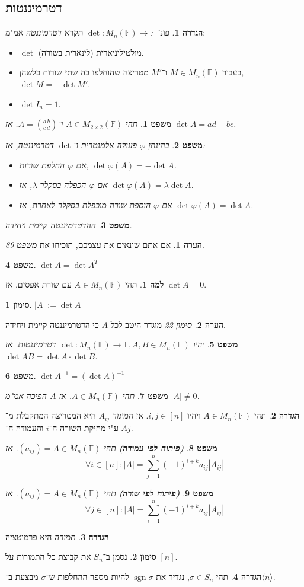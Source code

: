 \documentclass[]{article}
\newcommand\ra    {\rangle}
\newcommand\la    {\langle}
\DeclareMathOperator{\sgn}    {sgn}
\newcommand\F         {\mathbb{F}}
\newcommand\co        {\colon}
\renewcommand\lg      {\lambda}
\newcommand\sg        {\sigma}
\newcommand\op    {^{-1}}
\renewcommand\phi     {\varphi}
\newtheorem{Theorem}{משפט}
\theoremstyle{definition}
\newtheorem{definition}{הגדרה}
\newtheorem{Lemma}{למה}
\newtheorem{Remark}{הערה}
\newtheorem{Notion}{סימון}
\newcommand\theo  [1] {\begin{Theorem}#1\end{Theorem}}
\newcommand\defi  [1] {\begin{definition}#1\end{definition}}
\newcommand\rmark [1] {\begin{Remark}#1\end{Remark}}
\newcommand\lem   [1] {\begin{Lemma}#1\end{Lemma}}
\newcommand\noti  [1] {\begin{Notion}#1\end{Notion}}
\begin{document}
\begin{multicols}{2}
		\section{דטרמיננטות}
		\defi{פונ' $\det \co M_n(\F) \to \F$ תקרא \textit{דטרמיננטה} אמ"מ: 
		\begin{itemize}
			\item $\det$ מולטיליניארית (לינארית בשורה). 
			\item בעבור $M \in M_n(\F)$ ו־$M'$ מטריצה שהוחלפו בה שתי שורות כלשהן, $\det M = -\det M'$. 
			\item $\det I_n = 1$. 
		\end{itemize}}
		\theo{תהי $A \in M_{2 \times 2}(\F)$ ו־$A = \binom{a\, b}{c\, d}$. אז $\det A = ad - bc$. }
		\theo{בהינתן $\phi$ פעולה אלמנטרית ו־$\det$ דטרמיננטה, אז: 
		\begin{itemize}
			\item אם $\phi$ החלפת שורות, $\det \phi (A) = - \det A$. 
			\item אם $\phi$ הכפלה בסקלר $\lg$, אז $\det \phi (A) = \lg \det A$. 
			\item אם $\phi$ הוספת שורה מוכפלת בסקלר לאחרת, אז $\det \phi (A) = \det A$. 
		\end{itemize}}
		\theo{ההדטרמיננטה קיימת ויחידה. }
		\rmark{אם אתם שונאים את עצמכם, תוכיחו את \textit{משפט 89}. }
		\theo{$\det A = \det A^T$}
		\lem{תהי $A \in M_n(\F)$ עם שורת אפסים. אז $\det A = 0$. }
		\noti{\hfil $|A| := \det A$}
		\rmark{\textit{סימון 22} מוגדר היטב לכל $A$ כי הדטרמיננטה קיימת ויחידה. }
		\theo{יהיו $\det \co M_n(\F) \to \F, A, B \in M_n(\F)$ דטרמיננטות. אז $\det AB = \det A \cdot \det B$. }
		\theo{\hfil $\det A\op = (\det A)\op$}
		\theo{תהי $A \in M_n(\F)$. אז $A$ הפיכה אמ"מ $|A| \neq 0$. }
		\defi{תהי $A \in M_n(\F)$ ויהיו $i, j \in [n]$. אז ה\textit{מינור} $A_{ij}$ היא המטריצה המתקבלת מ־$A$ ע"י מחיקת השורה ה־$i$ והעמודה ה־$j$. }
		\begin{Theorem}\textbf{\textit{(פיתוח לפי עמודה)}}
			תהי $(a_{ij}) = A \in M_n(\F)$. אז 
			\[ \forall i \in [n] \co |A| = \sum_{j = 1}^{n}(-1)^{i + k}a_{ij} |A_{ij}| \]
		\end{Theorem}
		\begin{Theorem}\textbf{\textit{(פיתוח לפי שורה)}}
			תהי $(a_{ij}) = A \in M_n(\F)$. אז 
			\[ \forall j \in [n] \co |A| = \sum_{i = 1}^{n}(-1)^{i + k}a_{ij} |A_{ij}| \]
		\end{Theorem}
		
		\defi{\textit{תמורה} היא פרמוטציה}
		\noti{נסמן ב־$S_n$ את קבוצת כל התמורות על $[n]$. }
		\defi{תהי $\sg \in S_n$, נגדיר את $\sgn \sg$ להיות מספר ההחלפות ש־$\sg$ מבצעת ב־$\la n \ra$. }
		

\end{multicols}
\end{document}
